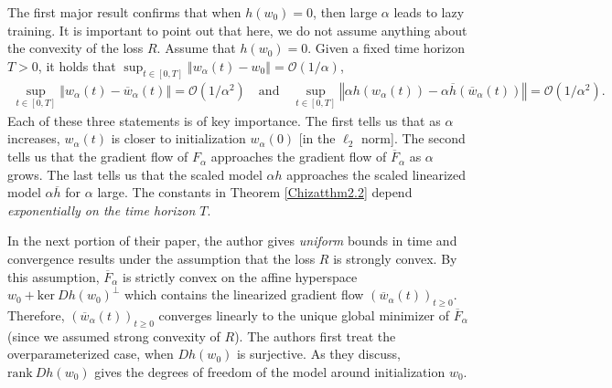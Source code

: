\documentclass{article}
\newenvironment{manualtheorem}[1]{%
  \renewcommand\themanualtheoreminner{#1}%
  \manualtheoreminner
}{\endmanualtheoreminner}
\begin{document}
The first major result confirms that when $h(w_0) = 0$, then large $\alpha$ leads to lazy training. It is important to point out that here, we do not assume anything about the convexity of the loss $R$.
\begin{manualtheorem}{2.2}\label{Chizatthm2.2}
Assume that $h(w_0) = 0$. Given a fixed time horizon $T > 0$, it holds that $\sup_{t \in [0, T]} \left\Vert w_{\alpha}(t) - w_0 \right\Vert = \mathcal{O}(1/\alpha)$,
\begin{align*}
    \sup_{t \in [0, T]} \left\Vert w_{\alpha}(t) - \overline{w}_{\alpha}(t) \right\Vert = \mathcal{O}(1/\alpha^2) \quad \text{and} \quad  \sup_{t \in [0, T]} \left\Vert \alpha h(w_{\alpha}(t)) - \alpha \overline{h}(\overline{w}_{\alpha}(t)) \right\Vert = \mathcal{O}(1/\alpha^2).
\end{align*}
\end{manualtheorem}
Each of these three statements is of key importance. The first tells us that as $\alpha$ increases, $w_{\alpha}(t)$ is closer to initialization $w_{\alpha}(0)$ [in the $\ell_2$ norm]. The second tells us that the gradient flow of $F_{\alpha}$ approaches the gradient flow of $\overline{F}_{\alpha}$ as $\alpha$ grows. The last tells us that the scaled model $\alpha h$ approaches the scaled linearized model $\alpha \overline{h}$ for $\alpha$ large. The constants in Theorem \ref{Chizatthm2.2} depend \textit{exponentially on the time horizon $T$}.

In the next portion of their paper, the author gives \textit{uniform} bounds in time and convergence results under the assumption that the loss $R$ is strongly convex. By this assumption, $\overline{F}_{\alpha}$ is strictly convex on the affine hyperspace $w_0 + \text{ker} \ Dh(w_0)^{\perp}$ which contains the linearized gradient flow $(\overline{w}_{\alpha}(t))_{t \geq 0}$. Therefore, $(\overline{w}_{\alpha}(t))_{t \geq 0}$ converges linearly to the unique global minimizer of $\overline{F}_{\alpha}$ (since we assumed strong convexity of $R$). The authors first treat the overparameterized case, when $Dh(w_0)$ is surjective. As they discuss, $\text{rank} \ Dh(w_0)$ gives the degrees of freedom of the model around initialization $w_0$. 
\end{document}
